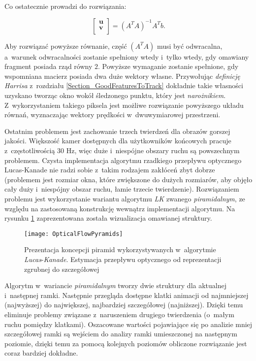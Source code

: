       Co ostatecznie prowadzi do rozwiązania:

        \begin{equation}
          \begin{bmatrix}
            \mathbf{u} \\
            \mathbf{v} \\
          \end{bmatrix} = (A^{T}A)^{-1} A^{T}b.
        \end{equation}

      Aby rozwiązać powyższe równanie, część $(A^{T}A)$ musi być odwracalna, a~warunek odwracalności zostanie spełniony wtedy i~tylko wtedy, gdy omawiany fragment posiada rząd równy $2$. Powyższe wymaganie zostanie spełnione, gdy wspomniana macierz posiada dwa duże wektory własne. Przywołując \textit{definicję Harrisa} z~rozdziału \ref{Section_GoodFeaturesToTrack} dokładnie takie własności uzyskano tworząc okno wokół śledzonego punktu, który jest \textit{narożnikiem}. Z~wykorzystaniem takiego piksela jest możliwe rozwiązanie powyższego układu równań, wyznaczając wektory prędkości w~dwuwymiarowej przestrzeni.

      Ostatnim problemem jest zachowanie trzech twierdzeń dla obrazów gorszej jakości. Większość kamer dostępnych dla użytkowników końcowych pracuje z~częstotliwością 30 Hz, więc duże i~niespójne obszary ruchu są powszechnym problemem. Czysta implementacja algorytmu rzadkiego przepływu optycznego Lucas-Kanade nie radzi sobie z~takim rodzajem zakłóceń zbyt dobrze (problemem jest rozmiar okna, które zwiększone do dużych rozmiarów, aby objęło cały duży i~niespójny obszar ruchu, łamie trzecie twierdzenie). Rozwiązaniem problemu jest wykorzystanie wariantu algorytmu \textit{LK} zwanego \textit{piramidalnym}, ze względu na zastosowaną konstrukcję wewnątrz implementacji algorytmu. Na rysunku \ref{fig:OpticalFlowPyramids} zaprezentowana została wizualizacja omawianej struktury.

        \begin{figure}[!ht]
          \centering
          \texttt{[image: OpticalFlowPyramids]}
          \caption[Prezentacja koncepcji piramid]{Prezentacja koncepcji piramid wykorzystywanych w~algorytmie \textit{Lucas}-\textit{Kanade}. Estymacja przepływu optycznego od reprezentacji zgrubnej do szczegółowej}
          \label{fig:OpticalFlowPyramids}
        \end{figure}

      Algorytm w~wariancie \textit{piramidalnym} tworzy dwie struktury dla aktualnej i~następnej ramki. Następnie przegląda dostępne klatki animacji od najmniejszej (najwyższej) do największej, najbardziej szczegółowej (najniższej). Dzięki temu eliminuje problemy związane z~naruszeniem drugiego twierdzenia (o~małym ruchu pomiędzy klatkami). Oszacowane wartości pojawiające się po analizie mniej szczegółowej ramki są wejściem do analizy ramki umieszczonej na następnym poziomie, dzięki temu za pomocą kolejnych poziomów obliczone rozwiązanie jest coraz bardziej dokładne.

